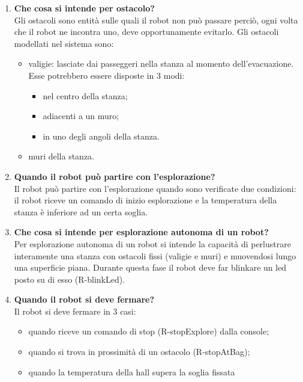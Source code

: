 \begin{enumerate}
\item  \textbf{Che cosa si intende per ostacolo?}\\
Gli ostacoli sono entità sulle quali il robot non può passare perciò, ogni volta che il robot ne incontra uno, deve opportunamente evitarlo.
Gli ostacoli modellati nel sistema sono: 
    \begin{itemize}
        \item valigie: lasciate dai passeggeri nella stanza al momento  dell’evacuazione. Esse potrebbero essere disposte in 3 modi: 
          \begin{itemize}
                \item nel centro della stanza;
                \item adiacenti a un muro;
                \item in uno degli angoli della stanza.
           \end{itemize}
        \item muri della stanza.
    \end{itemize}

\item  \textbf{Quando il robot può partire con l’esplorazione?}\\
Il robot può partire con l’esplorazione quando sono verificate due condizioni: il robot riceve un comando di inizio esplorazione
e la temperatura della stanza è inferiore ad un certa soglia.

\item  \textbf{Che cosa si intende per esplorazione autonoma di un robot?}\\
Per esplorazione autonoma di un robot si intende la capacità di perlustrare interamente una stanza con ostacoli fissi (valigie e muri) e muovendosi lungo una superficie piana. Durante questa fase il robot deve far blinkare un led posto su di esso (R-blinkLed).

\item  \textbf{Quando il robot si deve fermare?}\\
Il robot si deve fermare in 3 casi:
\begin{itemize}
    \item quando riceve un comando di stop (R-stopExplore) dalla console; 
    \item quando si trova in prossimità di un ostacolo (R-stopAtBag);
    \item quando la temperatura della hall supera la soglia fissata
\end{itemize}


\end{enumerate}

